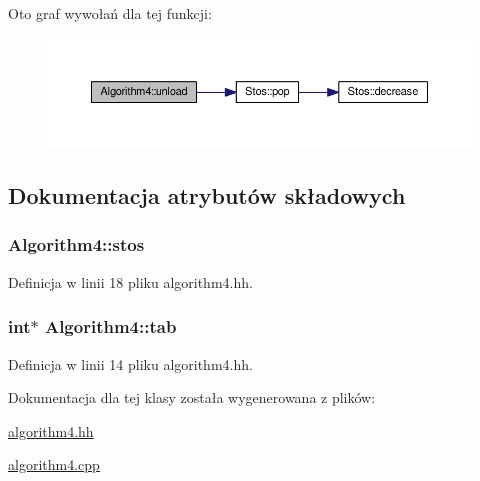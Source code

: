 Oto graf wywołań dla tej funkcji\-:\nopagebreak
\begin{figure}[H]
\begin{center}
\leavevmode
\includegraphics[width=350pt]{class_algorithm4_a673e2d2373378ab01a7f0378d978f162_cgraph}
\end{center}
\end{figure}




\subsection{Dokumentacja atrybutów składowych}
\hypertarget{class_algorithm4_aa9946110dc906caed6ddc49c60f7a3c8}{
\subsubsection[{stos}]{ Algorithm4\-::stos\hspace{0.3cm}{\ttfamily [private]}}}\label{class_algorithm4_aa9946110dc906caed6ddc49c60f7a3c8}


Definicja w linii 18 pliku algorithm4.\-hh.

\hypertarget{class_algorithm4_af1d4592e7fe12a51e6c3990ad52b0be1}{
\subsubsection[{tab}]{\setlength{\rightskip}{0pt plus 5cm}int$\ast$ Algorithm4\-::tab\hspace{0.3cm}{\ttfamily [private]}}}\label{class_algorithm4_af1d4592e7fe12a51e6c3990ad52b0be1}


Definicja w linii 14 pliku algorithm4.\-hh.



Dokumentacja dla tej klasy została wygenerowana z plików\-:\begin{DoxyCompactItemize}
\item 
\hyperlink{algorithm4_8hh}{algorithm4.\-hh}\item 
\hyperlink{algorithm4_8cpp}{algorithm4.\-cpp}\end{DoxyCompactItemize}
